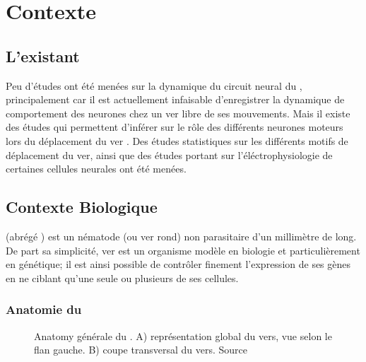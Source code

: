 \chapter{Contexte} %
\label{cha:Contexte}

\section{L'existant} %
\label{sec:L'existant}

Peu d'études ont été menées sur la dynamique du circuit neural du \celeg{},
principalement car il est actuellement infaisable d'enregistrer la dynamique de
comportement des neurones chez un ver libre de ses mouvements.  Mais il existe
des études qui permettent d'inférer sur le rôle des différents neurones moteurs
lors du déplacement du ver \cite{Yanik2006,Chronis2007,Leifer2011}.  Des études
statistiques sur les différents motifs de déplacement \cite{Gray2005} du ver,
ainsi que des études portant sur l'éléctrophysiologie de certaines cellules
neurales \cite{Mellem2008a,Lockery2009} ont été menées.


\section{Contexte Biologique} %
\label{sec:Contexte Biologique}

\caeleg{} (abrégé \celeg{}) est un nématode (ou ver rond) non parasitaire d'un
millimètre de long. De part sa simplicité, ver est un organisme modèle en biologie
et particulièrement en génétique; il est ainsi possible de contrôler
finement l'expression de ses gènes en ne ciblant qu'une seule ou plusieurs de
ses cellules.

\subsection{Anatomie du \celeg{}} %
\label{sub:Anatomie du caeleg}

\begin{figure}[ht]
   \begin{center}
   \end{center}
   \caption{Anatomy générale du \caeleg{}. A) représentation global du vers, vue selon le flan gauche. B) coupe transversal du vers. Source \cite{Boyle2009}}
   \label{fig:celegans_anatomy}
\end{figure}

